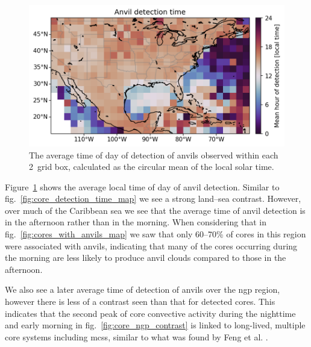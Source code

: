 \begin{figure}[tp]
    \centering
    \includegraphics[width=\textwidth]{figures/ch2_16.png}
    \caption[
    The average time of detection of anvils
    ]{
    The average time of day of detection of anvils observed within each 2\textdegree\ grid box, calculated as the circular mean of the local solar time.
    }
    \label{fig:anvil_detection_time_map}
\end{figure}

Figure~\ref{fig:anvil_detection_time_map} shows the average local time of day of anvil detection.
Similar to fig.~\ref{fig:core_detection_time_map} we see a strong land--sea contrast.
However, over much of the Caribbean sea we see that the average time of anvil detection is in the afternoon rather than in the morning.
When considering that in fig.~\ref{fig:cores_with_anvils_map} we saw that only 60--70\% of cores in this region were associated with anvils, indicating that many of the cores occurring during the morning are less likely to produce anvil clouds compared to those in the afternoon.

We also see a later average time of detection of anvils over the \acrshort{ngp} region, however there is less of a contrast seen than that for detected cores.
This indicates that the second peak of core convective activity during the nighttime and early morning in fig.~\ref{fig:core_ngp_contrast} is linked to long-lived, multiple core systems including \acrshort{mcs}s, similar to what was found by Feng et al. \cite{missing_feng_ngp}.

